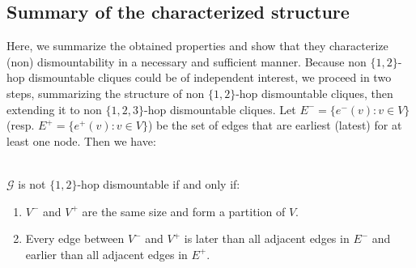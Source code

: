 \documentclass[USenglish, a4paper, thm-restate,numberwithinsect, cleveref]{lipics-v2021}
\newcommand{\G}{\ensuremath{\mathcal{G}}\xspace}
\begin{document}
\subsection{Summary of the characterized structure}

Here, we summarize the obtained properties and show that they characterize (non) dismountability in a necessary and sufficient manner. Because non $\{1,2\}$-hop dismountable cliques could be of independent interest, we proceed in two steps, summarizing the structure of non $\{1,2\}$-hop dismountable cliques, then extending it to non $\{1,2,3\}$-hop dismountable cliques.
Let $E^-=\{e^-(v) : v\in V\}$ (resp. $E^+=\{e^+(v) : v\in V\}$) be the set of edges that are earliest (latest) for at least one node. Then we have:
\begin{theorem}\label{lemma:2-hop-summary}~\\
    $\G$ is not $\{1,2\}$-hop dismountable if and only if:
    \begin{enumerate}
        \item $V^-$ and $V^+$ are the same size and form a partition of $V$.
        \item Every edge between $V^-$ and $V^+$ is later than all adjacent edges in $E^-$ and earlier than all adjacent edges in $E^+$.
    \end{enumerate}
\end{theorem}
\end{document}
